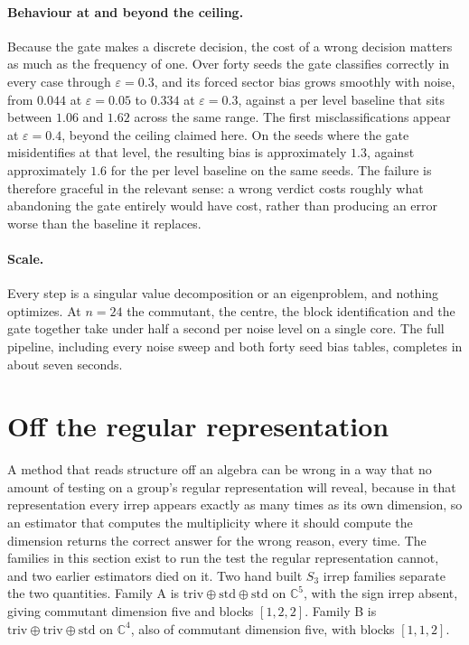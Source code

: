 \documentclass[11pt]{article}
\begin{document}
\paragraph{Behaviour at and beyond the ceiling.}
Because the gate makes a discrete decision, the cost of a wrong decision matters
as much as the frequency of one. Over forty seeds the gate classifies correctly
in every case through $\varepsilon=0.3$, and its forced sector bias grows
smoothly with noise, from $0.044$ at $\varepsilon=0.05$ to $0.334$ at
$\varepsilon=0.3$, against a per level baseline that sits between $1.06$ and
$1.62$ across the same range. The first misclassifications appear at
$\varepsilon=0.4$, beyond the ceiling claimed here. On the seeds where the gate
misidentifies at that level, the resulting bias is approximately $1.3$, against
approximately $1.6$ for the per level baseline on the same seeds. The failure is
therefore graceful in the relevant sense: a wrong verdict costs roughly what
abandoning the gate entirely would have cost, rather than producing an error
worse than the baseline it replaces.

\paragraph{Scale.}
Every step is a singular value decomposition or an eigenproblem, and nothing
optimizes. At $n=24$ the commutant, the centre, the block identification and the
gate together take under half a second per noise level on a single core. The full pipeline, including every noise sweep and both forty seed bias tables,
completes in about seven seconds.

\section{Off the regular representation}\label{sec:nonreg}
A method that reads structure off an algebra can be wrong in a way that no amount
of testing on a group's regular representation will reveal, because in that
representation every irrep appears exactly as many times as its own dimension, so
an estimator that computes the multiplicity where it should compute the dimension
returns the correct answer for the wrong reason, every time. The families in this
section exist to run the test the regular representation cannot, and two earlier
estimators died on it.
Two hand built $S_3$ irrep families separate the two quantities. Family A is
$\mathrm{triv}\oplus\mathrm{std}\oplus\mathrm{std}$ on $\mathbb{C}^5$, with the
sign irrep absent, giving commutant dimension five and blocks $[1,2,2]$. Family B
is $\mathrm{triv}\oplus\mathrm{triv}\oplus\mathrm{std}$ on $\mathbb{C}^4$, also
of commutant dimension five, with blocks $[1,1,2]$.
\end{document}
